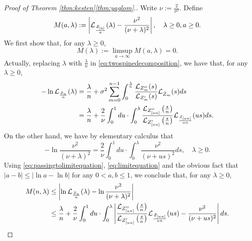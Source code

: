 \documentclass[12pt]{amsart}
\numberwithin{equation}{section}
\newcommand{\abs}[1]{\left| #1 \right|}
\newcommand{\expr}[1]{\left( #1 \right)}
\begin{document}
\medskip
\begin{proof}[Proof of Theorem \ref{thm:kesten}\eqref{thm:yaglom}.]
	Write $\nu:=\frac{2}{\sigma^2}$. Define
\begin{equation*}
		M(a,\lambda)
	:=
		\abs{\cL_{\frac{\dot Z_{[a]}}{a}}(\lambda)-
		\frac{\nu^2}{(\nu+\lambda)^2}},
	\quad
		\lambda \geq 0, a\geq 0.
		\end{equation*}
	We first show that, for any $\lambda\geq 0$,
\begin{equation}
\label{eq:Miszerofunction}
		M(\lambda)
	:=
		\limsup_{a\to\infty}M(a,\lambda)
	=
		0.
\end{equation}
	Actually, replacing $\lambda$ with $\frac{\lambda}{n}$ in \eqref{eq:twospinedecomposition}, we have that, for any $\lambda\geq 0$,
\begin{equation}
\label{eq:passingtolimitequation}
\begin{split}
		-\ln \cL_{\frac{\dot Z_n}{n}}(\lambda)
	&=
		\frac{\lambda}{n}+\sigma^2\sum_{m=0}^{n-1}\int_0^{\frac{\lambda}{n}} \frac{\cL_{Z''_m}(s)}{\cL_{Z'_m}(s)}\cL_{\dot Z_{m}}(s)ds
	\\&=
		\frac{\lambda}{n}+\frac{2}{\nu}\int_0^1 du \cdot \int_0^{\lambda} \frac{\cL_{Z''_{[un]}}\expr{\frac{s}{n}}}{\cL_{Z'_{[un]}}\expr{\frac{s}{n}}}\cL_{\frac{\dot Z_{[un]}}{un}}(us)ds.
\end{split}
\end{equation}
	On the other hand, we have by elementary calculus that
\begin{equation}
\label{eq:limitequation}
        -\ln\frac{\nu^2}{(\nu+\lambda)^2}
    =
		\frac{2}{\nu}\int_0^1du\cdot\int_0^\lambda \frac{\nu^2}{(\nu+us)^2}ds,
\quad \lambda\geq 0.
\end{equation}
	Using \eqref{eq:passingtolimitequation}, \eqref{eq:limitequation} and the obvious fact that $\abs{a-b}\leq\abs{\ln a-\ln b}$ for any $0<a,b\leq 1$, we conclude that, for any $\lambda\geq 0$,
\begin{equation}
\label{eq:inequalitybeforepassingtolimit}
\begin{split}
        M(n,\lambda)
    &\leq
		\abs{\ln \cL_{\frac{\dot Z_n}{n}}(\lambda)-\ln\frac{\nu^2}{(\nu+\lambda)^2}}
	\\&\leq
		\frac{\lambda}{n}
	+
	    \frac{2}{\nu}\int_0^1 du
	\cdot
	    \int_0^{\lambda} \abs{\frac{\cL_{Z''_{[un]}}\expr{\frac{s}{n}}}{\cL_{Z'_{[un]}}\expr{\frac{s}{n}}}\cL_{\frac{\dot Z_{[un]}}{un}}(us)- \frac{\nu^2}{(\nu+us)^2}}ds.
\end{split}
\end{equation}

\end{proof}
\end{document}
